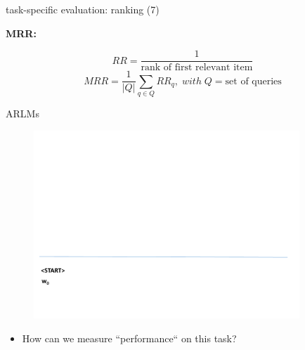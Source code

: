 
\begin{vbframe}{task-specific evaluation: ranking (7)}

\vfill

\textbf{MRR:}

$$RR = \dfrac{1}{\text{rank of first relevant item}}$$
$$MRR = \dfrac{1}{|Q|} \sum_{q \in Q} RR_q,\; with\; Q = \text{set of queries}$$

\vfill

\end{vbframe}


\begin{frame}{ARLMs}

\vspace{-1cm}

	\begin{figure}
		\centering
		\includegraphics[width=10cm,page=13]{figure/arlm.pdf}
	\end{figure}
	
\begin{itemize}
	\item \ques How can we measure ``performance`` on this task? 
\end{itemize}

\vfill

\end{frame}


